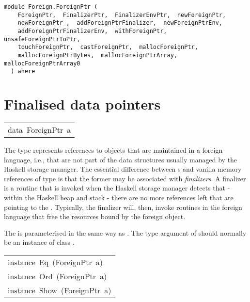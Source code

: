 \label{module:Foreign.ForeignPtr}
\haddockbeginheader
{\haddockverb\begin{verbatim}
module Foreign.ForeignPtr (
    ForeignPtr,  FinalizerPtr,  FinalizerEnvPtr,  newForeignPtr, 
    newForeignPtr_,  addForeignPtrFinalizer,  newForeignPtrEnv, 
    addForeignPtrFinalizerEnv,  withForeignPtr,  unsafeForeignPtrToPtr, 
    touchForeignPtr,  castForeignPtr,  mallocForeignPtr, 
    mallocForeignPtrBytes,  mallocForeignPtrArray,  mallocForeignPtrArray0
  ) where\end{verbatim}}
\haddockendheader

\section{Finalised data pointers
}
\begin{haddockdesc}
\item[\begin{tabular}{@{}l}
data\ ForeignPtr\ a
\end{tabular}]\haddockbegindoc
The type  represents references to objects that are
 maintained in a foreign language, i.e., that are not part of the
 data structures usually managed by the Haskell storage manager.
 The essential difference between s and vanilla memory
 references of type  is that the former may be associated
 with \emph{finalizers}. A finalizer is a routine that is invoked when
 the Haskell storage manager detects that - within the Haskell heap
 and stack - there are no more references left that are pointing to
 the .  Typically, the finalizer will, then, invoke
 routines in the foreign language that free the resources bound by
 the foreign object.
\par
The  is parameterised in the same way as .  The
 type argument of  should normally be an instance of
 class .
\par

\end{haddockdesc}
\begin{haddockdesc}
\item[\begin{tabular}{@{}l}
instance\ Eq\ (ForeignPtr\ a)\\instance\ Ord\ (ForeignPtr\ a)\\instance\ Show\ (ForeignPtr\ a)
\end{tabular}]
\end{haddockdesc}
